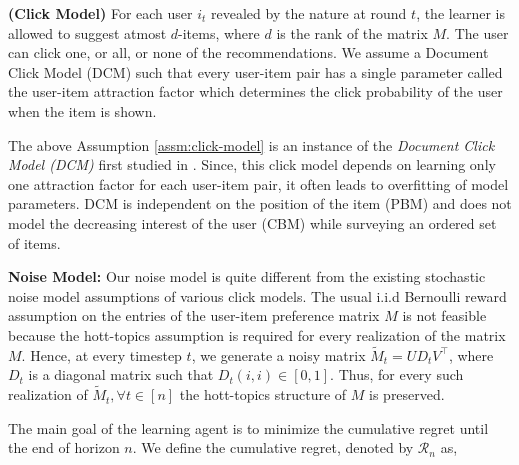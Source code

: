 \begin{assumption}\textbf{(Click Model)}
\label{assm:click-model}
For each user $i_t$ revealed by the nature at round $t$, the learner is allowed to suggest atmost $d$-items, where $d$ is the rank of the matrix $M$. The user can click one, or all, or none of the recommendations. We assume a Document Click Model (DCM) such that every user-item pair has a single parameter called the user-item attraction factor which determines the click probability of the user when the item is shown.  
\end{assumption}

\begin{discussion}
The above Assumption \ref{assm:click-model} is an instance of the \textit{Document Click Model (DCM)} first studied in \citet{craswell2008experimental}. Since, this click model depends on learning only one attraction factor for each user-item pair, it often leads to overfitting of model parameters. DCM is independent on the position of the item (PBM) and does not model the decreasing interest of the user (CBM) while surveying an ordered set of  items. 
\end{discussion}


\textbf{Noise Model:} Our noise model is quite different from the existing stochastic noise model assumptions of various click models. The usual i.i.d Bernoulli reward assumption on the entries of the user-item preference matrix $M$ is not feasible because the hott-topics assumption is required for every realization of the matrix $M$. Hence,  at every timestep $t$, we generate a noisy matrix $\tilde{M}_t = UD_t V^{\intercal}$, where $D_t$ is a diagonal matrix such that $D_t(i,i)\in[0,1]$. Thus, for every such realization of $\tilde{M}_t, \forall t\in [n]$ the hott-topics structure of $M$ is preserved.

The main goal of the learning agent is to minimize the cumulative regret until the end of horizon $n$. We define the cumulative regret, denoted by $\mathcal{R}_n$ as,

